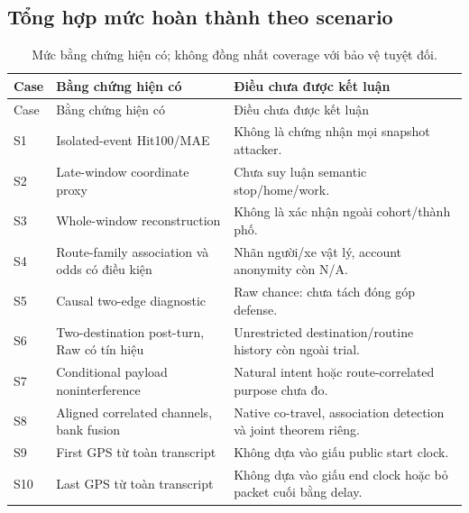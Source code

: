 \subsection{Tổng hợp mức hoàn thành theo scenario}
\begin{longtable}{@{}P{1cm}P{5.0cm}P{9.4cm}@{}}
\caption{Mức bằng chứng hiện có; không đồng nhất coverage với bảo vệ tuyệt đối.}\label{tab:scenario-status}\\
\toprule Case & Bằng chứng hiện có & Điều chưa được kết luận\\\midrule\endfirsthead
\toprule Case & Bằng chứng hiện có & Điều chưa được kết luận\\\midrule\endhead
\bottomrule\endfoot
S1 & Isolated-event Hit100/MAE & Không là chứng nhận mọi snapshot attacker.\\
S2 & Late-window coordinate proxy & Chưa suy luận semantic stop/home/work.\\
S3 & Whole-window reconstruction & Không là xác nhận ngoài cohort/thành phố.\\
S4 & Route-family association và odds có điều kiện & Nhãn người/xe vật lý, account anonymity còn N/A.\\
S5 & Causal two-edge diagnostic & Raw chance: chưa tách đóng góp defense.\\
S6 & Two-destination post-turn, Raw có tín hiệu & Unrestricted destination/routine history còn ngoài trial.\\
S7 & Conditional payload noninterference & Natural intent hoặc route-correlated purpose chưa đo.\\
S8 & Aligned correlated channels, bank fusion & Native co-travel, association detection và joint theorem riêng.\\
S9 & First GPS từ toàn transcript & Không dựa vào giấu public start clock.\\
S10 & Last GPS từ toàn transcript & Không dựa vào giấu end clock hoặc bỏ packet cuối bằng delay.\\
\end{longtable}

